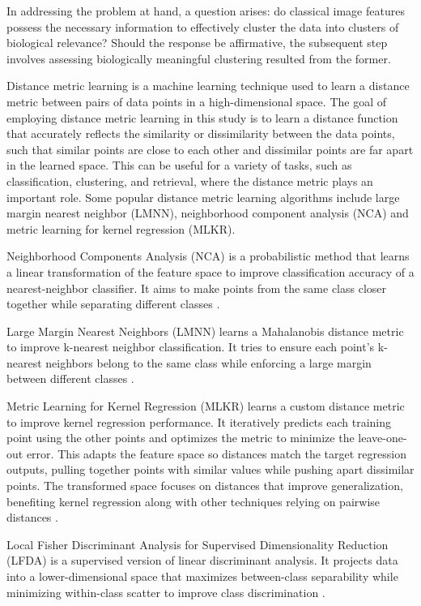 \documentclass[12pt,a4paper]{article}
\begin{document}
In addressing the problem at hand, a question arises: do classical image features possess the necessary information to effectively cluster the data into clusters of biological relevance? Should the response be affirmative, the subsequent step involves assessing biologically meaningful clustering resulted from the former.

Distance metric learning is a machine learning technique used to learn a distance metric between pairs of data points in a high-dimensional space. The goal of employing distance metric learning in this study is to learn a distance function that accurately reflects the similarity or dissimilarity between the data points, such that similar points are close to each other and dissimilar points are far apart in the learned space. This can be useful for a variety of tasks, such as classification, clustering, and retrieval, where the distance metric plays an important role. Some popular distance metric learning algorithms include large margin nearest neighbor (LMNN), neighborhood component analysis (NCA) and metric learning for kernel regression (MLKR). 

Neighborhood Components Analysis (NCA) is a probabilistic method that learns a linear transformation of the feature space to improve classification accuracy of a nearest-neighbor classifier. It aims to make points from the same class closer together while separating different classes \cite{xiang2004neighborhood}.

Large Margin Nearest Neighbors (LMNN) learns a Mahalanobis distance metric to improve k-nearest neighbor classification. It tries to ensure each point's k-nearest neighbors belong to the same class while enforcing a large margin between different classes \cite{weinberger2004learning}.

Metric Learning for Kernel Regression (MLKR) learns a custom distance metric to improve kernel regression performance. It iteratively predicts each training point using the other points and optimizes the metric to minimize the leave-one-out error. This adapts the feature space so distances match the target regression outputs, pulling together points with similar values while pushing apart dissimilar points. The transformed space focuses on distances that improve generalization, benefiting kernel regression along with other techniques relying on pairwise distances \cite{zhang2011multi}.

Local Fisher Discriminant Analysis for Supervised Dimensionality Reduction (LFDA) is a supervised version of linear discriminant analysis. It projects data into a lower-dimensional space that maximizes between-class separability while minimizing within-class scatter to improve class discrimination \cite{yang2007linear}.
\end{document}
